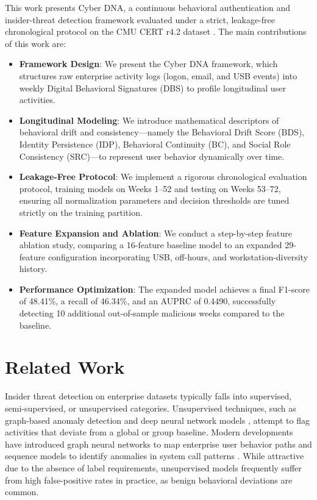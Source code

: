 \documentclass[pdflatex,sn-mathphys-num]{sn-jnl}
\theoremstyle{thmstyleone}
\theoremstyle{thmstyletwo}
\theoremstyle{thmstylethree}
\begin{document}
This work presents Cyber DNA, a continuous behavioral authentication and insider-threat detection framework evaluated under a strict, leakage-free chronological protocol on the CMU CERT r4.2 dataset \cite{cert2020dataset}. The main contributions of this work are:
\begin{itemize}
    \item \textbf{Framework Design}: We present the Cyber DNA framework, which structures raw enterprise activity logs (logon, email, and USB events) into weekly Digital Behavioral Signatures (DBS) to profile longitudinal user activities.
    \item \textbf{Longitudinal Modeling}: We introduce mathematical descriptors of behavioral drift and consistency---namely the Behavioral Drift Score (BDS), Identity Persistence (IDP), Behavioral Continuity (BC), and Social Role Consistency (SRC)---to represent user behavior dynamically over time.
    \item \textbf{Leakage-Free Protocol}: We implement a rigorous chronological evaluation protocol, training models on Weeks 1--52 and testing on Weeks 53--72, ensuring all normalization parameters and decision thresholds are tuned strictly on the training partition.
    \item \textbf{Feature Expansion and Ablation}: We conduct a step-by-step feature ablation study, comparing a 16-feature baseline model to an expanded 29-feature configuration incorporating USB, off-hours, and workstation-diversity history.
    \item \textbf{Performance Optimization}: The expanded model achieves a final F1-score of 48.41\%, a recall of 46.34\%, and an AUPRC of 0.4490, successfully detecting 10 additional out-of-sample malicious weeks compared to the baseline.
\end{itemize}

\section{Related Work}\label{sec2}
Insider threat detection on enterprise datasets typically falls into supervised, semi-supervised, or unsupervised categories. Unsupervised techniques, such as graph-based anomaly detection \cite{eberle2009anomaly} and deep neural network models \cite{tuor2017deep}, attempt to flag activities that deviate from a global or group baseline. Modern developments have introduced graph neural networks to map enterprise user behavior paths \cite{liang2023graph} and sequence models to identify anomalies in system call patterns \cite{landauer2020system}. While attractive due to the absence of label requirements, unsupervised models frequently suffer from high false-positive rates in practice, as benign behavioral deviations are common.
\end{document}

